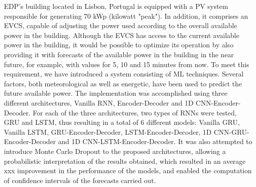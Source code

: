 \noindent \ac{EDP}'s building located in Lisbon, Portugal is equipped with a \ac{PV} system responsible for generating 70 kWp (kilowatt "peak"). In addition, it comprises an \ac{EVCS}, capable of adjusting the power used according to the overall available power in the building. Although the \ac{EVCS} has access to the current available power in the building, it would be possible to optimize its operation by also providing it with forecasts of the available power in the building in the near future, for example, with values for 5, 10 and 15 minutes from now. To meet this requirement, we have introduced a system consisting of \ac{ML} techniques. Several factors, both meteorological as well as energetic, have been used to predict the future available power. The implementation was accomplished using three different architectures, Vanilla \ac{RNN}, Encoder-Decoder and \ac{1D CNN}-Encoder-Decoder. For each of the three architectures, two types of \ac{RNN}s were tested, \ac{GRU} and \ac{LSTM}, thus resulting in a total of 6 different models: Vanilla \ac{GRU}, Vanilla \ac{LSTM}, \ac{GRU}-Encoder-Decoder, \ac{LSTM}-Encoder-Decoder, \ac{1D CNN}-\ac{GRU}-Encoder-Decoder and \ac{1D CNN}-\ac{LSTM}-Encoder-Decoder. It was also attempted to introduce Monte Carlo Dropout to the proposed architectures, allowing a probabilistic interpretation of the results obtained, which resulted in an average xxx improvement in the performance of the models, and enabled the computation of confidence intervals of the forecasts carried out. 
